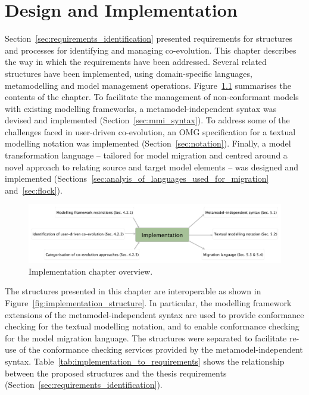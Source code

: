 
\chapter{Design and Implementation}
\label{Implementation}
Section~\ref{sec:requirements_identification} presented requirements for structures and processes for identifying and managing co-evolution. This chapter describes the way in which the requirements have been addressed. Several related structures have been implemented, using domain-specific languages, metamodelling and model management operations. Figure~\ref{fig:implementation_overview} summarises the contents of the chapter. To facilitate the management of non-conformant models with existing modelling frameworks, a metamodel-independent syntax was devised and implemented (Section~\ref{sec:mmi_syntax}). To address some of the challenges faced in user-driven co-evolution, an OMG specification for a textual modelling notation was implemented (Section~\ref{sec:notation}). Finally, a model transformation language -- tailored for model migration and centred around a novel approach to relating source and target model elements -- was designed and implemented (Sections~\ref{sec:analyis_of_languages_used_for_migration} and~\ref{sec:flock}). 

\begin{figure}[htbp]
  \begin{center}
    \leavevmode
    \includegraphics[width=12cm]{5.Implementation/overview.pdf}
  \end{center}
  \caption{Implementation chapter overview.}
  \label{fig:implementation_overview}
\end{figure}

The structures presented in this chapter are interoperable as shown in Figure~\ref{fig:implementation_structure}. In particular, the modelling framework extensions of the metamodel-independent syntax are used to provide conformance checking for the textual modelling notation, and to enable conformance checking for the model migration language. The structures were separated to facilitate re-use of the conformance checking services provided by the metamodel-independent syntax. Table~\ref{tab:implementation_to_requirements} shows the relationship between the proposed structures and the thesis requirements (Section~\ref{sec:requirements_identification}).

